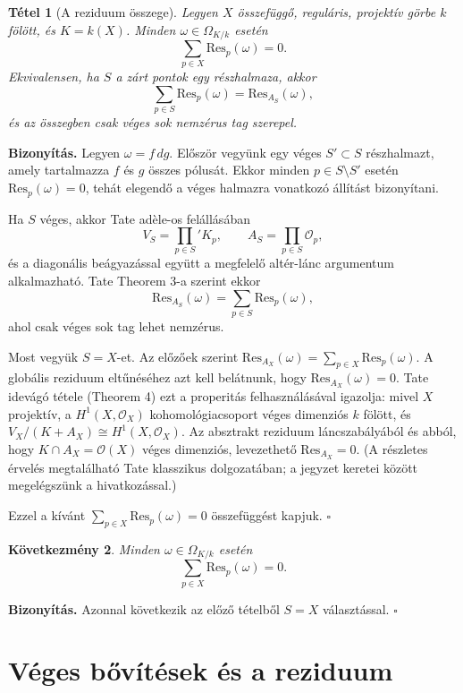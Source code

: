 \documentclass[a4paper,12pt]{article}
\theoremstyle{definition}
\newenvironment{biz}{\par\noindent\textbf{Bizonyítás.}\enspace\ignorespaces}
{\hfill$\square$\par}
\theoremstyle{plain}
\newtheorem{theorem}{Tétel}[section]
\newtheorem{corollary}[theorem]{Következmény}
\theoremstyle{remark}
\newcommand{\Res}{\mathrm{Res}}
\newcommand{\cO}{\mathcal{O}}
\begin{document}
\begin{theorem}[A reziduum összege]
\label{thm:global_residue_S}
Legyen $X$ összefüggő, reguláris, projektív görbe $k$ fölött, és $K=k(X)$.
Minden $\omega\in\Omega_{K/k}$ esetén
\[
\sum_{p\in X}\Res_p(\omega)=0.
\]
Ekvivalensen, ha $S$ a zárt pontok egy részhalmaza, akkor
\[
\sum_{p\in S}\Res_p(\omega)=\Res_{A_S}(\omega),
\]
és az összegben csak véges sok nemzérus tag szerepel.
\end{theorem}

\begin{biz}
Legyen $\omega=f\,dg$. Először vegyünk egy véges $S'\subset S$ részhalmazt, amely tartalmazza $f$ és $g$ összes pólusát. Ekkor minden $p\in S\setminus S'$ esetén $\Res_p(\omega)=0$, tehát elegendő a véges halmazra vonatkozó állítást bizonyítani.

Ha $S$ véges, akkor Tate adèle-os felállásában
\[
V_S=\prod_{p\in S}' K_p,\qquad A_S=\prod_{p\in S}\mathcal O_p,
\]
és a diagonális beágyazással együtt a megfelelő altér-lánc argumentum alkalmazható. Tate Theorem 3-a szerint ekkor
\[
\Res_{A_S}(\omega)=\sum_{p\in S}\Res_p(\omega),
\]
ahol csak véges sok tag lehet nemzérus.

Most vegyük $S=X$-et. Az előzőek szerint $\Res_{A_X}(\omega)=\sum_{p\in X}\Res_p(\omega)$. 
A globális reziduum eltűnéséhez azt kell belátnunk, hogy $\Res_{A_X}(\omega)=0$. 
Tate idevágó tétele (Theorem 4) ezt a properitás felhasználásával igazolja: mivel $X$ projektív, a 
$H^1(X,\cO_X)$ kohomológiacsoport véges dimenziós $k$ fölött, és $V_X/(K+A_X)\cong H^1(X,\cO_X)$. 
Az absztrakt reziduum láncszabályából és abból, hogy $K\cap A_X=\cO(X)$ véges dimenziós, levezethető $\Res_{A_X}=0$. 
(A részletes érvelés megtalálható Tate klasszikus dolgozatában; a jegyzet keretei között megelégszünk a hivatkozással.)

Ezzel a kívánt $\sum_{p\in X}\Res_p(\omega)=0$ összefüggést kapjuk.
\end{biz}

\begin{corollary}
\label{cor:sum_zero}
Minden $\omega\in\Omega_{K/k}$ esetén
\[
\sum_{p\in X}\Res_p(\omega)=0.
\]
\end{corollary}

\begin{biz}
Azonnal következik az előző tételből $S=X$ választással.
\end{biz}
\section{Véges bővítések és a reziduum}
\end{document}
